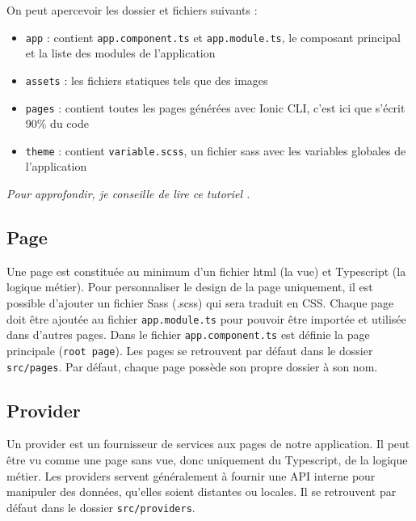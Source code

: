 \documentclass[a4paper, 12pt]{article}
\begin{document}
On peut apercevoir les dossier et fichiers suivants :
\begin{itemize}
    \item \texttt{app} : contient \texttt{app.component.ts} et \texttt{app.module.ts}, le composant principal et la liste des modules de l'application
    \item \texttt{assets} : les fichiers statiques tels que des images
    \item \texttt{pages} : contient toutes les pages générées avec Ionic CLI, c'est ici que s'écrit 90\% du code
    \item \texttt{theme} : contient \texttt{variable.scss}, un fichier sass avec les variables globales de l'application
\end{itemize}
\textit{Pour approfondir, je conseille de lire ce tutoriel \cite{ref20}.}

\subsection{Page}
Une page est constituée au minimum d'un fichier html (la vue) et Typescript (la logique métier). Pour personnaliser le 
design de la page uniquement, il est possible d'ajouter un fichier Sass (.scss) qui sera traduit en CSS. Chaque page doit être 
ajoutée au fichier \texttt{app.module.ts} pour pouvoir être importée et utilisée dans d'autres pages. Dans le fichier 
\texttt{app.component.ts} est définie la page principale (\texttt{root page}). Les pages se retrouvent 
par défaut dans le dossier \texttt{src/pages}. Par défaut, chaque page possède son propre dossier à son nom.

\subsection{Provider}
Un provider est un fournisseur de services aux pages de notre application. Il peut être vu comme une page sans vue, donc 
uniquement du Typescript, de la logique métier. Les providers servent généralement à fournir une API interne pour 
manipuler des données, qu'elles soient distantes ou locales. Il se retrouvent par défaut dans le dossier 
\texttt{src/providers}.
\end{document}
